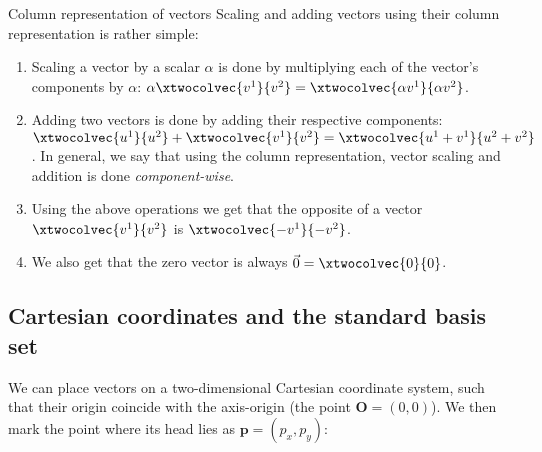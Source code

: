 \begin{summary}{Column representation of vectors}{}
  Scaling and adding vectors using their column representation is rather simple:
  \begin{enumerate}
    \item Scaling a vector by a scalar $\alpha$ is done by multiplying each of the vector's components by $\alpha$: $\alpha\xtwocolvec{v^{1}}{v^{2}}=\xtwocolvec{\alpha v^{1}}{\alpha v^{2}}$.
    \item Adding two vectors is done by adding their respective components: $\xtwocolvec{u^{1}}{u^{2}}+\xtwocolvec{v^{1}}{v^{2}}=\xtwocolvec{u^{1}+v^{1}}{u^{2}+v^{2}}$.
    In general, we say that using the column representation, vector scaling and addition is done \emph{component-wise}.
    \item Using the above operations we get that the opposite of a vector $\xtwocolvec{v^{1}}{v^{2}}$ is $\xtwocolvec{-v^{1}}{-v^{2}}$.
    \item We also get that the zero vector is always $\vec{0}=\xtwocolvec{0}{0}$.

  \end{enumerate}
\end{summary}

\subsection{Cartesian coordinates and the standard basis set}
We can place vectors on a two-dimensional Cartesian coordinate system, such that their origin coincide with the axis-origin (the point $\bm{O}=(0,0)$). We then mark the point where its head lies as $\bm{p}=(p_{x},p_{y})$:

\begin{center}
\end{center}

